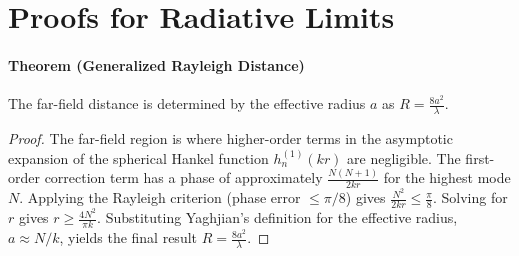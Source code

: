 \documentclass[11pt, a4paper]{report}
\begin{document}
\section{Proofs for Radiative Limits}
\paragraph{Theorem (Generalized Rayleigh Distance)} The far-field distance is determined by the effective radius $a$ as $R = \frac{8a^2}{\lambda}$.
\begin{proof}
The far-field region is where higher-order terms in the asymptotic expansion of the spherical Hankel function $h_n^{(1)}(kr)$ are negligible. The first-order correction term has a phase of approximately $\frac{N(N+1)}{2kr}$ for the highest mode $N$. Applying the Rayleigh criterion (phase error $\le \pi/8$) gives $\frac{N^2}{2kr} \le \frac{\pi}{8}$. Solving for $r$ gives $r \ge \frac{4N^2}{\pi k}$. Substituting Yaghjian's definition for the effective radius, $a \approx N/k$, yields the final result $R = \frac{8a^2}{\lambda}$.
\end{proof}
\end{document}
